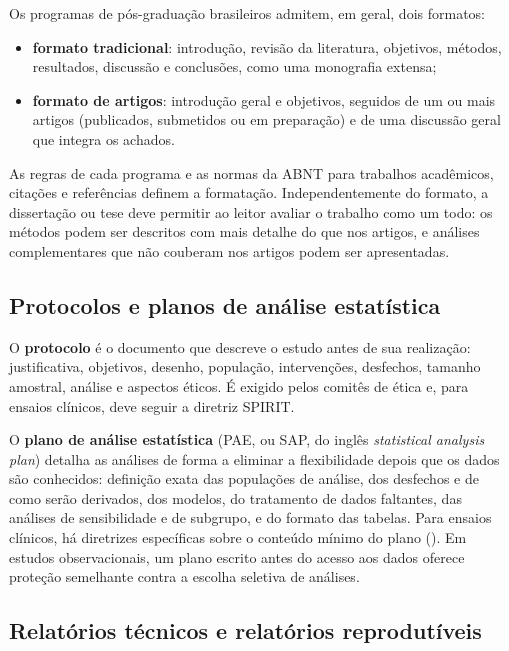 \documentclass[
]{book}
\providecommand{\tightlist}{%
  \setlength{\itemsep}{0pt}\setlength{\parskip}{0pt}}
\begin{document}
Os programas de pós-graduação brasileiros admitem, em geral, dois formatos:

\begin{itemize}
\tightlist
\item
  \textbf{formato tradicional}: introdução, revisão da literatura, objetivos, métodos, resultados, discussão e conclusões, como uma monografia extensa;
\item
  \textbf{formato de artigos}: introdução geral e objetivos, seguidos de um ou mais artigos (publicados, submetidos ou em preparação) e de uma discussão geral que integra os achados.
\end{itemize}

As regras de cada programa e as normas da ABNT para trabalhos acadêmicos, citações e referências definem a formatação. Independentemente do formato, a dissertação ou tese deve permitir ao leitor avaliar o trabalho como um todo: os métodos podem ser descritos com mais detalhe do que nos artigos, e análises complementares que não couberam nos artigos podem ser apresentadas.

\subsection{Protocolos e planos de análise estatística}\label{protocolos-e-planos-de-anuxe1lise-estatuxedstica}

O \textbf{protocolo} é o documento que descreve o estudo antes de sua realização: justificativa, objetivos, desenho, população, intervenções, desfechos, tamanho amostral, análise e aspectos éticos. É exigido pelos comitês de ética e, para ensaios clínicos, deve seguir a diretriz SPIRIT.

O \textbf{plano de análise estatística} (PAE, ou SAP, do inglês \emph{statistical analysis plan}) detalha as análises de forma a eliminar a flexibilidade depois que os dados são conhecidos: definição exata das populações de análise, dos desfechos e de como serão derivados, dos modelos, do tratamento de dados faltantes, das análises de sensibilidade e de subgrupo, e do formato das tabelas. Para ensaios clínicos, há diretrizes específicas sobre o conteúdo mínimo do plano (). Em estudos observacionais, um plano escrito antes do acesso aos dados oferece proteção semelhante contra a escolha seletiva de análises.

\subsection{Relatórios técnicos e relatórios reprodutíveis}\label{relatuxf3rios-tuxe9cnicos-e-relatuxf3rios-reprodutuxedveis}
\end{document}
